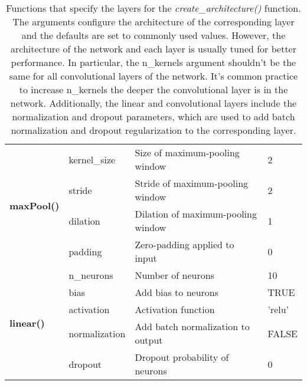 \documentclass[12pt,twoside]{scrreport}
\newcommand{\fn}[2][]{\textit{#2(}#1\textit{)}}
\begin{document}
\begin{table}[h!]
{\begin{tabular}{|llll|}
			\multirow{4}{*}{\textbf{maxPool()}}  & kernel\_size  & Size of maximum-pooling window                                                                                                    & 2         \\
			& stride        & Stride of maximum-pooling window                                                                                                  & 2         \\
			& dilation      & Dilation of maximum-pooling window                                                                                                & 1         \\
			& padding       & Zero-padding applied to input                                     & 0         \\
			\hline
			\multirow{5}{*}{\textbf{linear()}}   & n\_neurons    & Number of neurons                                                                                              & 10        \\
			& bias          & Add bias to neurons                                                              & TRUE      \\
			& activation    & Activation function                                                      & 'relu'    \\
			& normalization & Add batch normalization to output                                                      & FALSE     \\
			& dropout       & Dropout probability of neurons                                          & 0         \\ \hline
		\end{tabular}
	}
	\caption{Functions that specify the layers for the \fn{create\_architecture} function. The arguments configure the architecture of the corresponding layer and the defaults are set to commonly used values. However, the architecture of the network and each layer is usually tuned for better performance. In particular, the n\_kernels argument shouldn't be the same for all convolutional layers of the network. It's common practice to increase n\_kernels the deeper the convolutional layer is in the network. Additionally, the linear and convolutional layers include the normalization and dropout parameters, which are used to add batch normalization and dropout regularization to the corresponding layer.}
	\label{layers}
\end{table}
\end{document}
